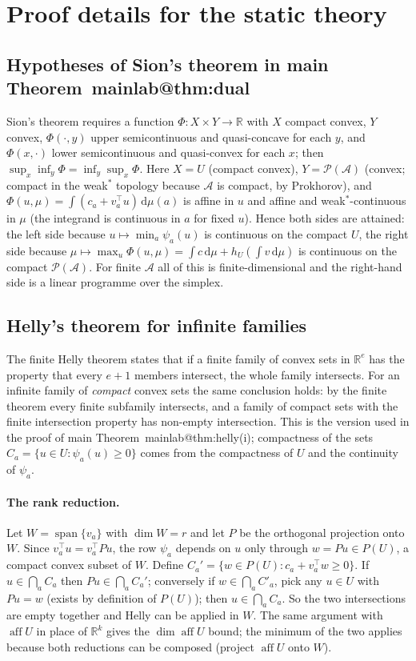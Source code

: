 \documentclass[11pt,a4paper]{article}
\makeatletter
\theoremstyle{plain}
\theoremstyle{definition}
\theoremstyle{remark}
\newcommand{\R}{\mathbb{R}}
\newcommand{\calA}{\mathcal{A}}
\newcommand{\calP}{\mathcal{P}}
\newcommand{\aff}{\operatorname{aff}}
\newcommand{\dd}{\,\mathrm{d}}
\newcommand{\mref}[1]{\csname mainlab@#1\endcsname}
\makeatother
\begin{document}
\section{Proof details for the static theory}\label{si:proofs}

\subsection{Hypotheses of Sion's theorem in main Theorem~\mref{thm:dual}}
Sion's theorem requires a function $\Phi:X\times Y\to\R$ with $X$ compact convex, $Y$ convex, $\Phi(\cdot,y)$ upper semicontinuous and quasi-concave for each $y$, and $\Phi(x,\cdot)$ lower semicontinuous and quasi-convex for each $x$; then $\sup_x\inf_y\Phi=\inf_y\sup_x\Phi$. Here $X=U$ (compact convex), $Y=\calP(\calA)$ (convex; compact in the weak$^\ast$ topology because $\calA$ is compact, by Prokhorov), and $\Phi(u,\mu)=\int(c_a+v_a^\top u)\dd\mu(a)$ is affine in $u$ and affine and weak$^\ast$-continuous in $\mu$ (the integrand is continuous in $a$ for fixed $u$). Hence both sides are attained: the left side because $u\mapsto\min_a\psi_a(u)$ is continuous on the compact $U$, the right side because $\mu\mapsto\max_u\Phi(u,\mu)=\int c\dd\mu+h_U(\int v\dd\mu)$ is continuous on the compact $\calP(\calA)$. For finite $\calA$ all of this is finite-dimensional and the right-hand side is a linear programme over the simplex.

\subsection{Helly's theorem for infinite families}
The finite Helly theorem states that if a finite family of convex sets in $\R^e$ has the property that every $e+1$ members intersect, the whole family intersects. For an infinite family of \emph{compact} convex sets the same conclusion holds: by the finite theorem every finite subfamily intersects, and a family of compact sets with the finite intersection property has non-empty intersection. This is the version used in the proof of main Theorem~\mref{thm:helly}(i); compactness of the sets $C_a=\{u\in U:\psi_a(u)\ge0\}$ comes from the compactness of $U$ and the continuity of $\psi_a$.

\paragraph{The rank reduction.} Let $W=\operatorname{span}\{v_a\}$ with $\dim W=r$ and let $P$ be the orthogonal projection onto $W$. Since $v_a^\top u=v_a^\top Pu$, the row $\psi_a$ depends on $u$ only through $w=Pu\in P(U)$, a compact convex subset of $W$. Define $C_a'=\{w\in P(U):c_a+v_a^\top w\ge0\}$. If $u\in\bigcap_aC_a$ then $Pu\in\bigcap_aC_a'$; conversely if $w\in\bigcap_aC'_a$, pick any $u\in U$ with $Pu=w$ (exists by definition of $P(U)$); then $u\in\bigcap_aC_a$. So the two intersections are empty together and Helly can be applied in $W$. The same argument with $\aff U$ in place of $\R^k$ gives the $\dim\aff U$ bound; the minimum of the two applies because both reductions can be composed (project $\aff U$ onto $W$).
\end{document}
